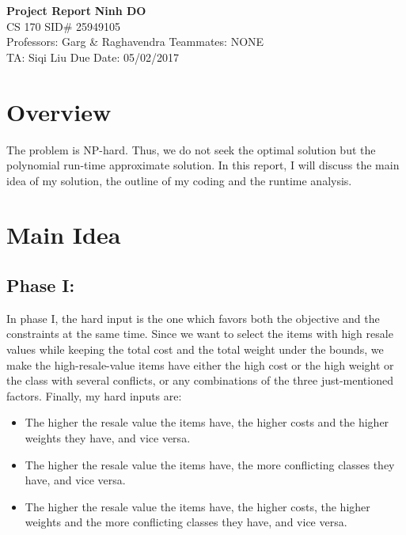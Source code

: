 \documentclass[a4paper, 11pt]{article}
\begin{document}
\noindent
\large\textbf{Project Report} \hfill \textbf{Ninh DO} \\
\normalsize CS 170 \hfill SID\# 25949105 \\
Professors: Garg \& Raghavendra \hfill Teammates: NONE \\
TA: Siqi Liu \hfill Due Date: 05/02/2017

\section{Overview}
The problem is NP-hard. Thus, we do not seek the optimal solution but the polynomial run-time approximate solution. In this report, I will discuss the main idea of my solution, the outline of my coding and the runtime analysis. 

\section{Main Idea}
	\subsection{Phase I:}
	In phase I, the hard input is the one which favors both the objective and the constraints at the same time. Since we want to select the items with high resale values while keeping the total cost and the total weight under the bounds, we make the high-resale-value items have either the high cost or the high weight or the class with several conflicts, or any combinations of the three just-mentioned factors. Finally, my hard inputs are:
	\begin{itemize}
		\item The higher the resale value the items have, the higher costs and the higher weights they have, and vice versa.
		\item The higher the resale value the items have, the more conflicting classes they have, and vice versa.
		\item The higher the resale value the items have, the higher costs, the higher weights and the more conflicting classes they have, and vice versa.
	\end{itemize}	
\end{document}
